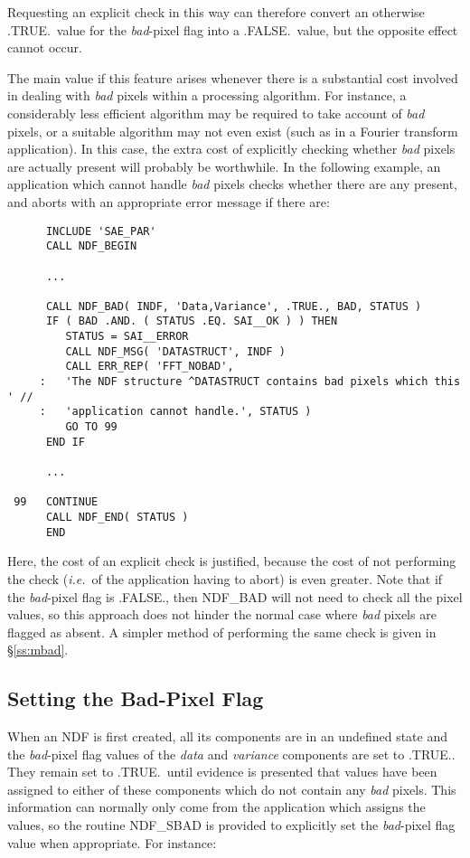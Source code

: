 \documentclass[twoside,11pt]{article}
\newcommand{\htmlref}[2]{#1}
\newcommand{\xlabel}[1]{}
\newcommand{\st}[1]{{\em{#1}}}
\begin{document}
Requesting an explicit check in this way can therefore convert an otherwise
.TRUE.\ value for the \st{bad\/}-pixel flag into a .FALSE.\ value, but the
opposite effect cannot occur. 

The main value if this feature arises whenever there is a substantial cost
involved in dealing with \st{bad\/} pixels within a processing algorithm. 
For instance, a considerably less efficient algorithm may be required to
take account of \st{bad\/} pixels, or a suitable algorithm may not even exist
(such as in a Fourier transform application).
In this case, the extra cost of explicitly checking whether \st{bad\/} pixels
are actually present will probably be worthwhile.
In the following example, an application which cannot handle \st{bad\/} 
pixels checks whether there are any present, and aborts with an appropriate 
error message if there are:

\small
\begin{verbatim}
      INCLUDE 'SAE_PAR'
      CALL NDF_BEGIN

      ...

      CALL NDF_BAD( INDF, 'Data,Variance', .TRUE., BAD, STATUS )
      IF ( BAD .AND. ( STATUS .EQ. SAI__OK ) ) THEN
         STATUS = SAI__ERROR
         CALL NDF_MSG( 'DATASTRUCT', INDF )
         CALL ERR_REP( 'FFT_NOBAD',
     :   'The NDF structure ^DATASTRUCT contains bad pixels which this ' //
     :   'application cannot handle.', STATUS )
         GO TO 99
      END IF

      ...

 99   CONTINUE
      CALL NDF_END( STATUS )
      END
\end{verbatim}
\normalsize

Here, the cost of an explicit check is justified, because the cost of not
performing the check (\st{i.e.}\ of the application having to abort) is even
greater. 
Note that if the \st{bad\/}-pixel flag is .FALSE., then NDF\_BAD will not
need to check all the pixel values, so this approach does not hinder the
normal case where \st{bad\/} pixels are flagged as absent. 
A simpler method of performing the same check is given in \S\ref{ss:mbad}. 

\subsection{\xlabel{setting_the_bad-pixel_flag}\label{ss:settingbadpixflag}Setting the Bad-Pixel Flag}

When an NDF is first created, all its components are in an undefined state and
the \st{bad\/}-pixel flag values of the \st{data\/} and \st{variance\/} components
are set to .TRUE.. 
They remain set to .TRUE.\ until evidence is presented that values have been
assigned to either of these components which do not contain any \st{bad\/}
pixels. 
This information can normally only come from the application which assigns the
values, so the routine \htmlref{NDF\_SBAD}{NDF_SBAD} is provided to explicitly set the \st{bad\/}-pixel flag value when appropriate. 
For instance:
\end{document}
